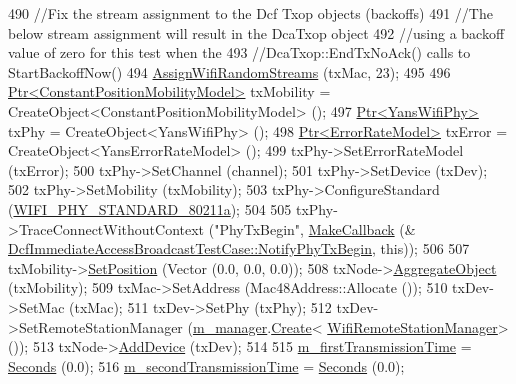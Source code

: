 \begin{DoxyCode}
490   \textcolor{comment}{//Fix the stream assignment to the Dcf Txop objects (backoffs)}
491   \textcolor{comment}{//The below stream assignment will result in the DcaTxop object}
492   \textcolor{comment}{//using a backoff value of zero for this test when the}
493   \textcolor{comment}{//DcaTxop::EndTxNoAck() calls to StartBackoffNow()}
494   \hyperlink{wifi-test_8cc_a27e1dfc9840ff9d220527fa04cbd65de}{AssignWifiRandomStreams} (txMac, 23);
495 
496   \hyperlink{classns3_1_1Ptr}{Ptr<ConstantPositionMobilityModel>} txMobility = 
      CreateObject<ConstantPositionMobilityModel> ();
497   \hyperlink{classns3_1_1Ptr}{Ptr<YansWifiPhy>} txPhy = CreateObject<YansWifiPhy> ();
498   \hyperlink{classns3_1_1Ptr}{Ptr<ErrorRateModel>} txError = CreateObject<YansErrorRateModel> ();
499   txPhy->SetErrorRateModel (txError);
500   txPhy->SetChannel (channel);
501   txPhy->SetDevice (txDev);
502   txPhy->SetMobility (txMobility);
503   txPhy->ConfigureStandard (\hyperlink{group__wifi_gga1299834f4e1c615af3ca738033b76a49a22db1e8022db2c3450414b86c77b11e4}{WIFI\_PHY\_STANDARD\_80211a});
504 
505   txPhy->TraceConnectWithoutContext (\textcolor{stringliteral}{"PhyTxBegin"}, \hyperlink{group__makecallbackmemptr_ga9376283685aa99d204048d6a4b7610a4}{MakeCallback} (&
      \hyperlink{classDcfImmediateAccessBroadcastTestCase_aea9ca6e51a5ef1b43729b86e4ac209d2}{DcfImmediateAccessBroadcastTestCase::NotifyPhyTxBegin},
       \textcolor{keyword}{this}));
506 
507   txMobility->\hyperlink{classns3_1_1MobilityModel_ac584b3d5a309709d2f13ed6ada1e7640}{SetPosition} (Vector (0.0, 0.0, 0.0));
508   txNode->\hyperlink{classns3_1_1Object_a79dd435d300f3deca814553f561a2922}{AggregateObject} (txMobility);
509   txMac->SetAddress (Mac48Address::Allocate ());
510   txDev->SetMac (txMac);
511   txDev->SetPhy (txPhy);
512   txDev->SetRemoteStationManager (\hyperlink{classDcfImmediateAccessBroadcastTestCase_ab8f20ef6ae6e7c13de2d3e5cb95bc052}{m\_manager}.\hyperlink{classns3_1_1ObjectFactory_a18152e93f0a6fe184ed7300cb31e9896}{Create}<
      \hyperlink{classns3_1_1WifiRemoteStationManager}{WifiRemoteStationManager}> ());
513   txNode->\hyperlink{classns3_1_1Node_a42ff83ee1d5d1649c770d3f5b62375de}{AddDevice} (txDev);
514 
515   \hyperlink{classDcfImmediateAccessBroadcastTestCase_a90fe73456a50aa8d866a4488a636da18}{m\_firstTransmissionTime} = \hyperlink{group__timecivil_ga33c34b816f8ff6628e33d5c8e9713b9e}{Seconds} (0.0);
516   \hyperlink{classDcfImmediateAccessBroadcastTestCase_a89eee6c68fefdc0af43f7b610a3ec686}{m\_secondTransmissionTime} = \hyperlink{group__timecivil_ga33c34b816f8ff6628e33d5c8e9713b9e}{Seconds} (0.0);

\end{DoxyCode}
